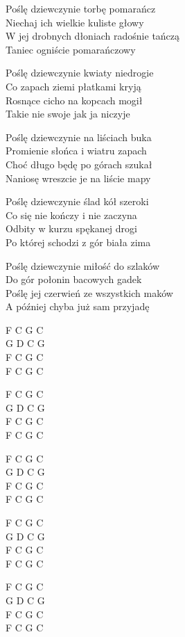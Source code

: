 \begin{text}
    Poślę dziewczynie torbę pomarańcz\\
    Niechaj ich wielkie kuliste głowy\\
    W jej drobnych dłoniach radośnie tańczą\\
    Taniec ogniście pomarańczowy

    Poślę dziewczynie kwiaty niedrogie\\
    Co zapach ziemi płatkami kryją\\
    Rosnące cicho na kopcach mogił\\
    Takie nie swoje jak ja niczyje

    Poślę dziewczynie na liściach buka\\
    Promienie słońca i wiatru zapach\\
    Choć długo będę po górach szukał\\
    Naniosę wreszcie je na liście mapy

    Poślę dziewczynie ślad kół szeroki\\
    Co się nie kończy i nie zaczyna\\
    Odbity w kurzu spękanej drogi\\
    Po której schodzi z gór biała zima

    Poślę dziewczynie miłość do szlaków\\
    Do gór połonin bacowych gadek\\
    Poślę jej czerwień ze wszystkich maków\\
    A później chyba już sam przyjadę
\end{text}
\begin{chord}
    F C G C\\
    G D C G\\
    F C G C\\
    F C G C

    F C G C\\
    G D C G\\
    F C G C\\
    F C G C

    F C G C\\
    G D C G\\
    F C G C\\
    F C G C

    F C G C\\
    G D C G\\
    F C G C\\
    F C G C

    F C G C\\
    G D C G\\
    F C G C\\
    F C G C
\end{chord}